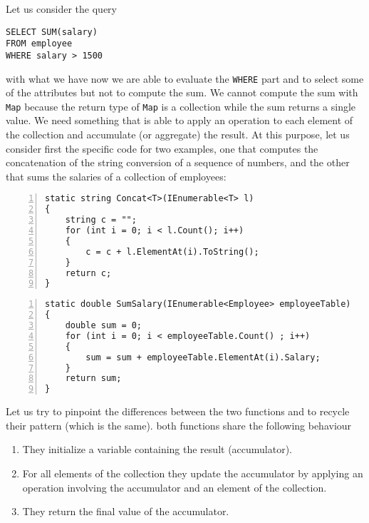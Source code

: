Let us consider the query

\begin{lstlisting}[caption = Example query for Reduce, label = code:reduce_query]
SELECT SUM(salary)
FROM employee
WHERE salary > 1500
\end{lstlisting}

\noindent
with what we have now we are able to evaluate the \texttt{WHERE} part and to select some of the attributes but not to compute the sum. We cannot compute the sum with \texttt{Map} because the return type of \texttt{Map} is a collection while the sum returns a single value. We need something that is able to apply an operation to each element of the collection and accumulate (or aggregate) the result. At this purpose, let us consider first the specific code for two examples, one that computes the concatenation of the string conversion of a sequence of numbers, and the other that sums the salaries of a collection of employees:

\begin{minipage}[t]{0.45\textwidth}
	\begin{lstlisting}[numbers = left, label = code:reduce_comparison_left, caption = Code to concatenate the string representations of numbers]
static string Concat<T>(IEnumerable<T> l)
{
	string c = "";
	for (int i = 0; i < l.Count(); i++)
	{
		c = c + l.ElementAt(i).ToString();
	}
	return c;
}
	\end{lstlisting}
\end{minipage}\hfill
\begin{minipage}[t]{0.45\textwidth}
	\begin{lstlisting}[numbers = left, label = code:reduce_comparison_right, caption = Code to compute the sum of the salaries of the employees]
static double SumSalary(IEnumerable<Employee> employeeTable)
{
	double sum = 0;
	for (int i = 0; i < employeeTable.Count() ; i++)
	{
		sum = sum + employeeTable.ElementAt(i).Salary;
	}
	return sum;
}
	\end{lstlisting}
\end{minipage}

\noindent
Let us try to pinpoint the differences between the two functions and to recycle their pattern (which is the same). both functions share the following behaviour

\begin{enumerate}[noitemsep]
	\item They initialize a variable containing the result (accumulator).
	\item For all elements of the collection they update the accumulator by applying an operation involving the accumulator and an element of the collection.
	\item They return the final value of the accumulator.
\end{enumerate}

